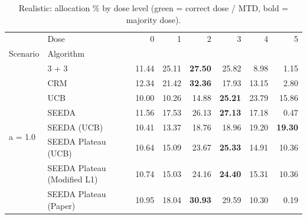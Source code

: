 \begin{table}[H]
\centering
\caption{Realistic: allocation \% by dose level (green = correct dose / MTD, bold = majority dose).}
\label{tab:real_alloc_by_dose}
\begin{tabular}{llrrrrrr}
\toprule
 & Dose & 0 & 1 & 2 & 3 & 4 & 5 \\
Scenario & Algorithm &  &  &  &  &  &  \\
\midrule
\multirow[c]{8}{*}{a = 1.0} & 3 + 3 & 11.44 & 25.11 & {\cellcolor[HTML]{C8E6C9}} \bfseries 27.50 & 25.82 & 8.98 & 1.15 \\
 & CRM & 12.34 & 21.42 & {\cellcolor[HTML]{C8E6C9}} \bfseries 32.36 & 17.93 & 13.15 & 2.80 \\
 & UCB & 10.00 & 10.26 & {\cellcolor[HTML]{C8E6C9}} 14.88 & \bfseries 25.21 & 23.79 & 15.86 \\
 & SEEDA & 11.56 & 17.53 & {\cellcolor[HTML]{C8E6C9}} 26.13 & \bfseries 27.13 & 17.18 & 0.47 \\
 & SEEDA (UCB) & 10.41 & 13.37 & {\cellcolor[HTML]{C8E6C9}} 18.76 & 18.96 & 19.20 & \bfseries 19.30 \\
 & SEEDA Plateau (UCB) & 10.64 & 15.09 & {\cellcolor[HTML]{C8E6C9}} 23.67 & \bfseries 25.33 & 14.91 & 10.36 \\
 & SEEDA Plateau (Modified L1) & 10.74 & 15.03 & {\cellcolor[HTML]{C8E6C9}} 24.16 & \bfseries 24.40 & 15.31 & 10.36 \\
 & SEEDA Plateau (Paper) & 10.95 & 18.04 & {\cellcolor[HTML]{C8E6C9}} \bfseries 30.93 & 29.59 & 10.30 & 0.19 \\
\bottomrule
\end{tabular}
\end{table}
